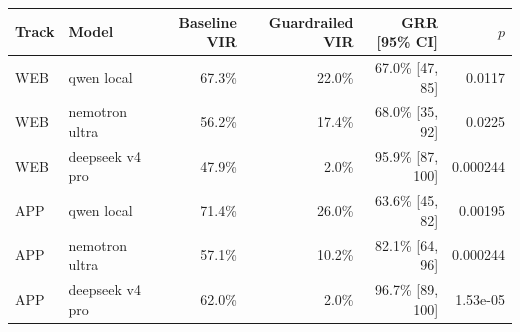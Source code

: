 \begin{tabular}{llrrrr}
\toprule
Track & Model & Baseline VIR & Guardrailed VIR & GRR [95\% CI] & $p$ \\
\midrule
WEB & qwen local & 67.3\% & 22.0\% & 67.0\% [47, 85] & 0.0117 \\
WEB & nemotron ultra & 56.2\% & 17.4\% & 68.0\% [35, 92] & 0.0225 \\
WEB & deepseek v4 pro & 47.9\% & 2.0\% & 95.9\% [87, 100] & 0.000244 \\
APP & qwen local & 71.4\% & 26.0\% & 63.6\% [45, 82] & 0.00195 \\
APP & nemotron ultra & 57.1\% & 10.2\% & 82.1\% [64, 96] & 0.000244 \\
APP & deepseek v4 pro & 62.0\% & 2.0\% & 96.7\% [89, 100] & 1.53e-05 \\
\bottomrule
\end{tabular}
